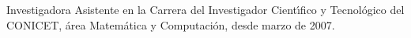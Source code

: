 
\item Investigadora Asistente en la Carrera del Investigador
Cient\'{\i}fico y Tecnol\'ogico del CONICET, \'area Matem\'atica y
Computaci\'on, desde marzo de 2007.
